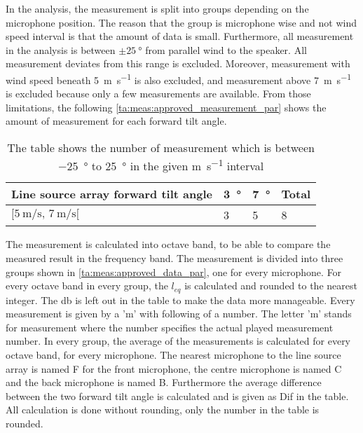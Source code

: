 
In the analysis, the measurement is split into groups depending on the microphone position. The reason that the group is microphone wise and not wind speed interval is that the amount of data is small. Furthermore, all measurement in the analysis is between $\pm\SI{25}{\degree}$ from parallel wind to the speaker.  All measurement deviates from this range is excluded. Moreover, measurement with wind speed beneath \SI{5}{\meter\per\second} is also excluded, and measurement above \SI{7}{\meter\per\second} is excluded because only a few measurements are available.  From those limitations, the following \autoref{ta:meas:approved_measurement_par} shows the amount of measurement for each forward tilt angle. 

\begin{table}[H]
\centering
\caption{The table shows the number of measurement which is between \SI{-25}{\degree} to \SI{25}{\degree} in the given \si{\meter\per\second} interval}
\begin{tabular}{l|l|l|l}
Line source array forward tilt angle & \SI{3}{\degree}  & \SI{7}{\degree} & Total \\ \hline
$[\SI{5}{\meter\per\second},\, \SI{7}{\meter\per\second}[  $        & 3  & 5  & 8     \\      
\end{tabular}
\label{ta:meas:approved_measurement_par}
\end{table}

The measurement is calculated into octave band, to be able to compare the measured result in the frequency band. The measurement is divided into three groups shown in \autoref{ta:meas:approved_data_par}, one for every microphone. For every octave band in every group, the $l_{eq}$ is calculated and rounded to the nearest integer. The \si{\decibel} is left out in the table to make the data more manageable. Every measurement is given by a 'm' with following of a number. The letter 'm' stands for measurement where the number specifies the actual played measurement number. In every group, the average of the measurements is calculated for every octave band, for every microphone. The nearest microphone to the line source array is named F for the front microphone, the centre microphone is named C and the back microphone is named B. Furthermore the average difference between the two forward tilt angle is calculated and is given as Dif in the table. All calculation is done without rounding, only the number in the table is rounded.

